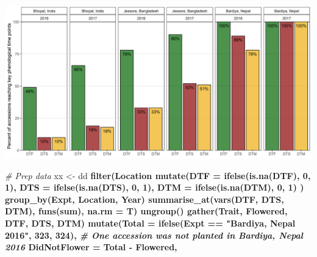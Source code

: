 \documentclass[
]{article}
\newenvironment{Shaded}{\begin{snugshade}}{\end{snugshade}}
\newcommand{\CommentTok}[1]{\textcolor[rgb]{0.56,0.35,0.01}{\textit{#1}}}
\newcommand{\DataTypeTok}[1]{\textcolor[rgb]{0.13,0.29,0.53}{#1}}
\newcommand{\DecValTok}[1]{\textcolor[rgb]{0.00,0.00,0.81}{#1}}
\newcommand{\KeywordTok}[1]{\textcolor[rgb]{0.13,0.29,0.53}{\textbf{#1}}}
\newcommand{\NormalTok}[1]{#1}
\newcommand{\OperatorTok}[1]{\textcolor[rgb]{0.81,0.36,0.00}{\textbf{#1}}}
\newcommand{\StringTok}[1]{\textcolor[rgb]{0.31,0.60,0.02}{#1}}
\begin{document}
\includegraphics{Supplemental_Figure_02.png}

\begin{Shaded}
\begin{Highlighting}[]
\CommentTok{# Prep data}
\NormalTok{xx <-}\StringTok{ }\NormalTok{dd }\OperatorTok{%
\StringTok{  }\KeywordTok{filter}\NormalTok{(Location }\OperatorTok{%
\StringTok{  }\KeywordTok{mutate}\NormalTok{(}\DataTypeTok{DTF =} \KeywordTok{ifelse}\NormalTok{(}\KeywordTok{is.na}\NormalTok{(DTF), }\DecValTok{0}\NormalTok{, }\DecValTok{1}\NormalTok{),}
         \DataTypeTok{DTS =} \KeywordTok{ifelse}\NormalTok{(}\KeywordTok{is.na}\NormalTok{(DTS), }\DecValTok{0}\NormalTok{, }\DecValTok{1}\NormalTok{),}
         \DataTypeTok{DTM =} \KeywordTok{ifelse}\NormalTok{(}\KeywordTok{is.na}\NormalTok{(DTM), }\DecValTok{0}\NormalTok{, }\DecValTok{1}\NormalTok{) ) }\OperatorTok{%
\StringTok{  }\KeywordTok{group_by}\NormalTok{(Expt, Location, Year) }\OperatorTok{%
\StringTok{  }\KeywordTok{summarise_at}\NormalTok{(}\KeywordTok{vars}\NormalTok{(DTF, DTS, DTM), }\KeywordTok{funs}\NormalTok{(sum), }\DataTypeTok{na.rm =}\NormalTok{ T) }\OperatorTok{%
\StringTok{  }\KeywordTok{ungroup}\NormalTok{() }\OperatorTok{%
\StringTok{  }\KeywordTok{gather}\NormalTok{(Trait, Flowered, DTF, DTS, DTM) }\OperatorTok{%
\StringTok{  }\KeywordTok{mutate}\NormalTok{(}\DataTypeTok{Total =} \KeywordTok{ifelse}\NormalTok{(Expt }\OperatorTok{==}\StringTok{ "Bardiya, Nepal 2016"}\NormalTok{, }\DecValTok{323}\NormalTok{, }\DecValTok{324}\NormalTok{),}
         \CommentTok{# One accession was not planted in Bardiya, Nepal 2016}
         \DataTypeTok{DidNotFlower =}\NormalTok{ Total }\OperatorTok{-}\StringTok{ }\NormalTok{Flowered,}
}}}}}}}
\end{Highlighting}
\end{Shaded}
\end{document}
